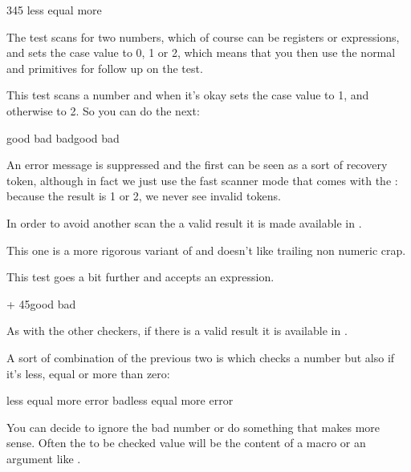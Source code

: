\starttyping[option=TEX]
 345 less \or equal \else more \fi
\stoptyping

The test scans for two numbers, which of course can be registers or expressions,
and sets the case value to 0, 1 or 2, which means that you then use the normal
\type {\or} and \type {\else} primitives for follow up on the test.

\stopsectionlevel

\startsectionlevel[title={\tex{ifchknum}}]

This test scans a number and when it's okay sets the case value to 1, and otherwise
to 2. So you can do the next:

\starttyping[option=TEX]
\or good \else bad \fi
\ifchknum bad\or good \else bad \fi
\stoptyping

An error message is suppressed and the first \type {\or} can be seen as a sort of
recovery token, although in fact we just use the fast scanner mode that comes
with the \type {\ifcase}: because the result is 1 or 2, we never see invalid
tokens.

In order to avoid another scan the a valid result it is made available in \type
{\lastchknumber}.

\stopsectionlevel

\startsectionlevel[title={\tex{ifchknumber}}]

This one is a more rigorous variant of \type {\ifchknum} and doesn't like
trailing non numeric crap.

\stopsectionlevel

\startsectionlevel[title={\tex{ifchknumexpr}}]

This test goes a bit further and accepts an expression.

\starttyping[option=TEX]
 + 45\or good \else bad \fi
\stoptyping

As with the other checkers, if there is a valid result it is available in \type
{\lastchknumber}.

\stopsectionlevel

\startsectionlevel[title={\tex{ifnumval}}]

A sort of combination of the previous two is \type {\ifnumval} which checks a
number but also if it's less, equal or more than zero:

\starttyping[option=TEX]
\or less \or equal \or more \else error \fi
\ifnumval bad\or less \or equal \or more \else error \fi
\stoptyping

You can decide to ignore the bad number or do something that makes more sense.
Often the to be checked value will be the content of a macro or an argument like
.

